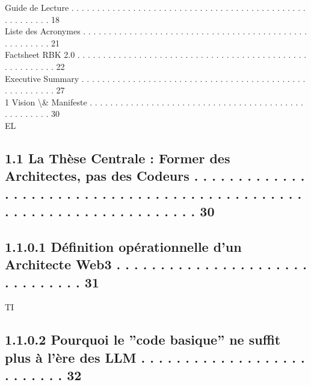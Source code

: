 Guide de Lecture . . . . . . . . . . . . . . . . . . . . . . . . . . . . . . . . . . . . . . . . . . . . . . . . . . . . . . . 18\\
Liste des Acronymes . . . . . . . . . . . . . . . . . . . . . . . . . . . . . . . . . . . . . . . . . . . . . . . . . . . . . 21\\
Factsheet RBK 2.0 . . . . . . . . . . . . . . . . . . . . . . . . . . . . . . . . . . . . . . . . . . . . . . . . . . . . . . . 22\\
Executive Summary . . . . . . . . . . . . . . . . . . . . . . . . . . . . . . . . . . . . . . . . . . . . . . . . . . . . . . 27\\
1     Vision \textbackslash{}& Manifeste . . . . . . . . . . . . . . . . . . . . . . . . . . . . . . . . . . . . . . . . . . . . . . . . . . . 30\\
\vspace{0.5em}
\vspace{0.5em}
\vspace{0.5em}
\vspace{0.5em}
EL\\
\subsection{1.1     La Thèse Centrale : Former des Architectes, pas des Codeurs . . . . . . . . . . . . . . . . . . . . . . . . . . . . . . . . . . . . . . . . . . . . . . . . . . . . . . . . . . . . . . . . . . . . . 30}
\subsection{1.1.0.1           Définition opérationnelle d’un Architecte Web3 . . . . . . . . . . . . . . . . . . . . . . . . . . . . . . .                                                                                                               31}
\vspace{0.5em}
\vspace{0.5em}
\vspace{0.5em}
\vspace{0.5em}
TI\\
\subsection{1.1.0.2           Pourquoi le ”code basique” ne suffit plus à l’ère des LLM . . . . . . . . . . . . . . . . . . . . . . . . . .                                                                                                              32}
